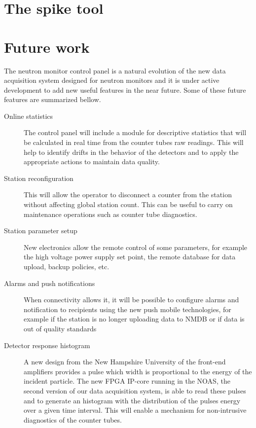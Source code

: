 \documentclass[a4paper]{jpconf}
\begin{document}
\section{The spike tool}



\section{Future work}

The neutron monitor control panel is a natural evolution of the new data
acquisition system designed for neutron monitors and it is under active
development to add new useful features in the near future. Some of these future
features are summarized bellow.

\begin{description}
    \item[Online statistics] The control panel will include a module for
        descriptive statistics that will be calculated in real time from the
        counter tubes raw readings. This will help to identify drifts in the
        behavior of the detectors and to apply the appropriate actions to
        maintain data quality.
    \item[Station reconfiguration] This will allow the operator to disconnect a
        counter from the station without affecting global station count. This
        can be useful to carry on maintenance operations such as counter tube
        diagnostics. 
    \item[Station parameter setup] New electronics allow the remote control of
        some parameters, for example the high voltage power supply set point,
        the remote database for data upload, backup policies, etc.
    \item[Alarms and push notifications] When connectivity allows it, it will
        be possible to configure alarms and notification to recipients using
        the new push mobile technologies, for example if the station is no
        longer uploading data to NMDB or if data is out of quality standards
    \item[Detector response histogram] A new design from the New
        Hampshire University of the front-end amplifiers provides a pulse which
        width is proportional to the energy of the incident particle. The new
        FPGA IP-core running in the NOAS, the second version of our data
        acquisition system, is able to read these pulses and to generate an
        histogram with the distribution of the pulses energy over a given time
        interval. This will enable a mechanism for non-intrusive diagnostics of
        the counter tubes. 
\end{description}
\end{document}

